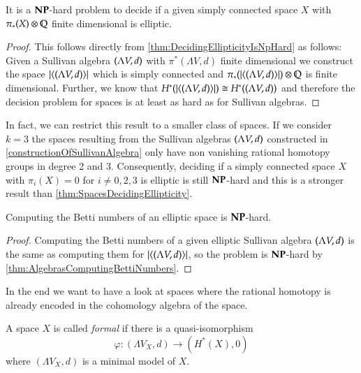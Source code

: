 \begin{Theorem}
 \label{thm:SpacesDecidingEllipticity}
 It is a $\mathbf{NP}$-hard problem to decide if a given simply connected space $X$ with  $\pi_*(X) \otimes \mathbb{Q}$
 finite dimensional is elliptic.
\end{Theorem}

\begin{proof}
 This follows directly from \ref{thm:DecidingEllipticityIsNpHard} as follows:
 Given a Sullivan algebra $(\Lambda V,d)$ with $\pi^*(\Lambda V,d)$ finite dimensional we construct the 
 space $| \langle (\Lambda V,d) \rangle |$ which is simply connected and 
 $\pi_*(| \langle (\Lambda V,d) \rangle |) \otimes \mathbb{Q}$ is finite dimensional. Further, we know that 
 $H^*(| \langle (\Lambda V,d) \rangle |) \cong H^*( (\Lambda V,d))$ and therefore the decision problem for 
 spaces is at least as hard as for Sullivan algebras.
\end{proof}

\begin{Remark}
 In fact, we can restrict this result to a smaller class of spaces. If we consider $k = 3$ the spaces resulting from
 the Sullivan algebras $(\Lambda V,d)$ constructed in \ref{constructionOfSullivanAlgebra} only have non vanishing rational
 homotopy groups in degree 2 and 3. Consequently, deciding if a simply connected space $X$ with
 $\pi_i(X) = 0$ for $i \neq 0,2,3$ is elliptic is still $\mathbf{NP}$-hard and this is a stronger result than
 \ref{thm:SpacesDecidingEllipticity}.
\end{Remark}

\begin{Theorem}
 Computing the Betti numbers of an elliptic space is $\mathbf{NP}$-hard.
\end{Theorem}

\begin{proof}
 Computing the Betti numbers of a given elliptic Sullivan algebra $(\Lambda V,d)$ is the same as computing
 them for $ | \langle (\Lambda V,d) \rangle |$, so the problem is $\mathbf{NP}$-hard by \ref{thm:AlgebrasComputingBettiNumbers}.
\end{proof}


In the end we want to have a look at spaces where the rational homotopy is already encoded in the cohomology 
algebra of the space.

\begin{Definition}
 A space $X$ is called \emph{formal} if there is a quasi-isomorphism
 $$ \varphi \colon (\Lambda V_X , d) \to (H^*(X),0)$$
 where $(\Lambda V_X,d)$ is a minimal model of $X$.
\end{Definition}

